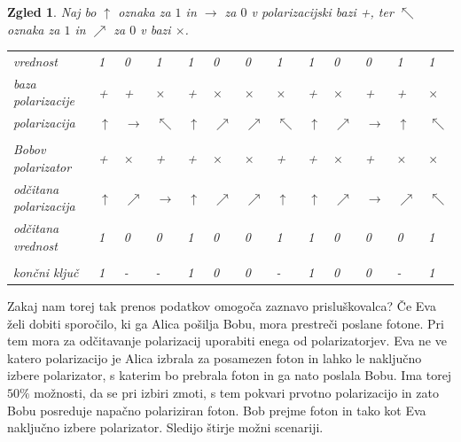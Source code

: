 \documentclass[A4paper, 11pt]{article}
\newtheorem{zgled}{Zgled}
\begin{document}
\begin{zgled}
Naj bo $\uparrow$ oznaka za $1$ in $\rightarrow$ za $0$ v polarizacijski bazi +, ter $\nwarrow$ oznaka za $1$ in $\nearrow$ za $0$ v bazi $\times$.


\begin{center}
\begin{tabular}{ l m{0.3 cm} m{0.3 cm} m{0.3 cm} m{0.3 cm} m{0.3 cm} m{0.3 cm} m{0.3 cm} m{0.3 cm} m{0.3 cm} m{0.3 cm} m{0.3 cm} m{0.3 cm}}
vrednost & 1 & 0 & 1 & 1 & 0 & 0 & 1 & 1 & 0 & 0 & 1 & 1 \\
baza polarizacije & + & + & $\times$ & + & $\times$ & $\times$ & $\times$ & + & $\times$ & + & + & $\times$\\
polarizacija & $\uparrow$ & $\rightarrow$ & $\nwarrow$ & $\uparrow$ & $\nearrow$ & $\nearrow$ & $\nwarrow$  & $\uparrow$ & $\nearrow$ & $\rightarrow$ & $\uparrow$ & $\nwarrow$\\
\\
Bobov polarizator & + & $\times$ & + & + & $\times$ & $\times$ & + & + & $\times$ & + & $\times$ & $\times$\\
odčitana polarizacija & $\uparrow$ & $\nearrow$ & $\rightarrow$ & $\uparrow$ & $\nearrow$  & $\nearrow$ & $\uparrow$ & $\uparrow$ & $\nearrow$ & $\rightarrow$ & $\nearrow$ & $\nwarrow$\\
odčitana vrednost & 1 & 0 & 0 & 1 & 0 & 0 & 1 & 1 & 0 & 0 & 0 & 1\\
\\
končni ključ & 1 & - & - & 1 & 0 & 0 & - & 1 & 0 & 0 & - & 1\\
\end{tabular}
\end{center}

\end{zgled}

Zakaj nam torej tak prenos podatkov omogoča zaznavo prisluškovalca?
Če Eva želi dobiti sporočilo, ki ga Alica pošilja Bobu, mora prestreči poslane fotone. Pri tem mora za odčitavanje polarizacij uporabiti enega od polarizatorjev. Eva ne ve katero polarizacijo je Alica izbrala za posamezen foton in lahko le naključno izbere polarizator, s katerim bo prebrala foton in ga nato poslala Bobu. Ima torej $50\%$ možnosti, da se pri izbiri zmoti, s tem pokvari prvotno polarizacijo in zato Bobu posreduje napačno polariziran foton. Bob prejme foton in tako kot Eva naključno izbere polarizator. Sledijo štirje možni scenariji.
\end{document}
